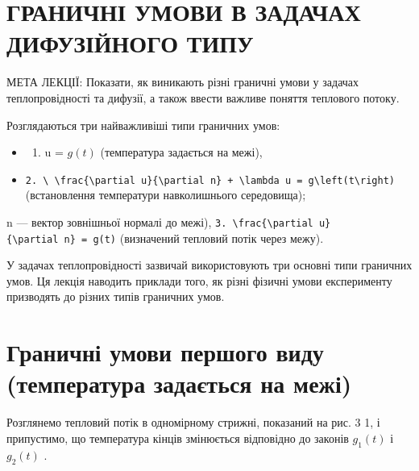 \documentclass[
  ukrainian,
]{article}
\providecommand{\tightlist}{%
  \setlength{\itemsep}{0pt}\setlength{\parskip}{0pt}}
\begin{document}
\section{ГРАНИЧНІ УМОВИ В ЗАДАЧАХ ДИФУЗІЙНОГО
ТИПУ}\label{ux433ux440ux430ux43dux438ux447ux43dux456-ux443ux43cux43eux432ux438-ux432-ux437ux430ux434ux430ux447ux430ux445-ux434ux438ux444ux443ux437ux456ux439ux43dux43eux433ux43e-ux442ux438ux43fux443}

МЕТА ЛЕКЦІЇ: Показати, як виникають різні граничні умови у задачах
теплопровідності та дифузії, а також ввести важливе поняття теплового
потоку.

Розглядаються три найважливіші типи граничних умов:

\begin{itemize}
\tightlist
\item
  \begin{enumerate}
  \def\labelenumi{\arabic{enumi}.}
  \tightlist
  \item
    u = \(g(t)\) (температура задається на межі),
  \end{enumerate}
\item
  \texttt{2.\ \textbackslash{}\ \textbackslash{}frac\{\textbackslash{}partial\ u\}\{\textbackslash{}partial\ n\}\ +\ \textbackslash{}lambda\ u\ =\ g\textbackslash{}left(t\textbackslash{}right)}
  (встановлення температури навколишнього середовища);
\end{itemize}

n --- вектор зовнішньої нормалі до межі),
\texttt{3.\ \textbackslash{}frac\{\textbackslash{}partial\ u\}\{\textbackslash{}partial\ n\}\ =\ g(t)}
(визначений тепловий потік через межу).

У задачах теплопровідності зазвичай використовують три основні типи
граничних умов. Ця лекція наводить приклади того, як різні фізичні умови
експерименту призводять до різних типів граничних умов.

\section{Граничні умови першого виду (температура задається на
межі)}\label{ux433ux440ux430ux43dux438ux447ux43dux456-ux443ux43cux43eux432ux438-ux43fux435ux440ux448ux43eux433ux43e-ux432ux438ux434ux443-ux442ux435ux43cux43fux435ux440ux430ux442ux443ux440ux430-ux437ux430ux434ux430ux454ux442ux44cux441ux44f-ux43dux430-ux43cux435ux436ux456}

Розглянемо тепловий потік в одномірному стрижні, показаний на рис. 3 1,
і припустимо, що температура кінців змінюється відповідно до законів
\(g_1(t)\) і \(g_2(t)\) .
\end{document}
